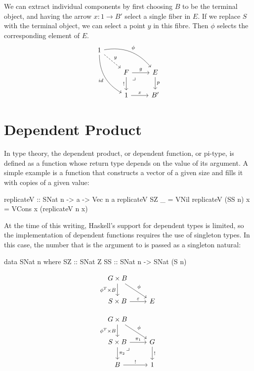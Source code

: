 \documentclass[DaoFP]{subfiles}
\begin{document}
We can extract individual components by first choosing $B$ to be the terminal object, and having the arrow $x \colon 1 \to B'$ select a single fiber in $E$. If we replace $S$ with the terminal object, we can select a point $y$ in this fibre. Then $\phi$ selects the corresponding element of $E$.
\[
 \begin{tikzcd}
 1
 \arrow[dr, dashed, "y"]
 \arrow[drr, bend left, "\phi"]
 \arrow[ddr, bend right, "id"']
 \\
 &F
\arrow[dr, phantom,  , very near start, "\lrcorner"]
 \arrow[r, "g"]
 \arrow[d, "!"']
 &E
 \arrow[d, "p"]
 \\
 &1
 \arrow[r, "x"]
 &B'
  \end{tikzcd}
\]

\section{Dependent Product}

In type theory, the dependent product, or dependent function, or pi-type, is defined as a function whose return type depends on the value of its argument. A simple example is a function that constructs a vector of a given size and fills it with copies of a given value:
\begin{haskell}
replicateV :: SNat n -> a -> Vec n a
replicateV SZ _ = VNil
replicateV (SS n) x = VCons x (replicateV n x)
\end{haskell}

At the time of this writing, Haskell's support for dependent types is limited, so the implementation of dependent functions requires the use of singleton types. In this case, the number that is the argument to  is passed as a singleton natural:
\begin{haskell}
data SNat n where
  SZ :: SNat Z
  SS :: SNat n -> SNat (S n)
\end{haskell}



\[
 \begin{tikzcd}
 G \times B
 \arrow[d, "\phi^T \times B"']
 \arrow[dr, "\phi"]
 \\
 S \times B
 \arrow[r, "\varepsilon"]
 &E
  \end{tikzcd}
\]

\[
 \begin{tikzcd}
 G \times B
 \arrow[d, "\phi^T \times B"']
 \arrow[dr, "\phi"]
 \\
 S \times B
 \arrow[dr, phantom,  , very near start, "\lrcorner"]
\arrow[d, "\pi_2"]
 \arrow[r, "\pi_1"]
 & G
 \arrow[d, "!"]
 \\
 B
 \arrow[r, "!"]
 &
 1
  \end{tikzcd}
\]
\end{document}
